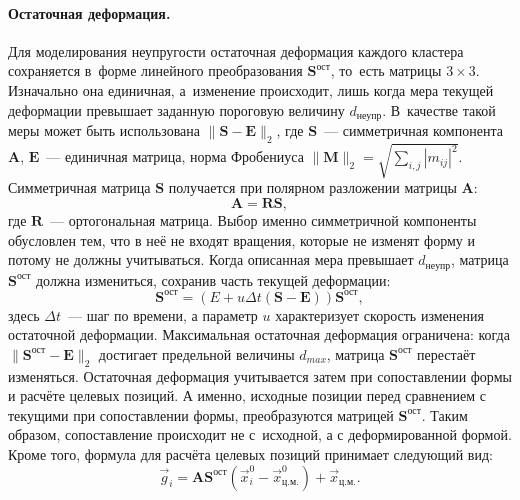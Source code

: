 \documentclass[a4paper, 14pt, titlepage]{extarticle}
\newcommand{\vect}[1]{\vec{#1}} %
\newcommand{\matx}[1]{\mathbf{#1}} %
\begin{document}
        \paragraph{Остаточная деформация.} Для моделирования неупругости остаточная деформация
        каждого кластера сохраняется в~форме линейного преобразования $\matx{S}^{ост}$, то~есть
        матрицы $3 \times 3$. Изначально она единичная, а~изменение происходит, лишь когда мера
        текущей деформации превышает заданную пороговую величину $d_{неупр}$. В~качестве такой меры может быть
        использована $ \|\matx S - \matx E\|_2 $, где $\matx S$~--- симметричная компонента $\matx
        A$, $\matx E$~--- единичная матрица, норма Фробениуса $\|\matx M\|_2 = \sqrt{\sum_{i, j} |m_{ij}|^2}$.
        Симметричная матрица $\matx S$ получается при полярном разложении матрицы $\matx A$:
        \begin{equation}\label{eq:polar_decomposition}
          \matx A = \matx R \matx S,
        \end{equation}
        где $\matx R$~--- ортогональная матрица. Выбор именно симметричной компоненты обусловлен
        тем, что в неё не входят вращения, которые не изменят форму и потому не должны учитываться.
        Когда описанная мера превышает $d_{неупр}$, матрица $\matx{S}^{ост}$ должна измениться,
        сохранив часть текущей деформации:
        \begin{equation}
          \matx{S}^{ост} = \left(E + u \Delta t (\matx S - \matx E) \right) \matx{S}^{ост},
        \end{equation}
        здесь $\Delta t$~--- шаг по времени, а параметр $u$ характеризует скорость изменения
        остаточной деформации. Максимальная остаточная деформация ограничена: когда
        $\|\matx{S}^{ост} - \matx E\|_2$ достигает предельной величины $d_{max}$, матрица
        $\matx{S}^{ост}$ перестаёт изменяться. Остаточная деформация учитывается затем при
        сопоставлении формы и расчёте целевых позиций. А именно, исходные позиции перед сравнением
        с текущими при сопоставлении формы, преобразуются матрицей $\matx{S}^{ост}$. Таким
        образом, сопоставление происходит не с~исходной, а с деформированной формой. Кроме того, формула для
        расчёта целевых позиций принимает следующий вид:
        \begin{equation}\label{eq:goal_pos}
          \vect{g}_i = \matx{A} \matx{S}^{ост} (\vect{x}^0_i - \vect{x}^0_{ц.м.}) + \vect{x}_{ц.м.}.
        \end{equation}
\end{document}
